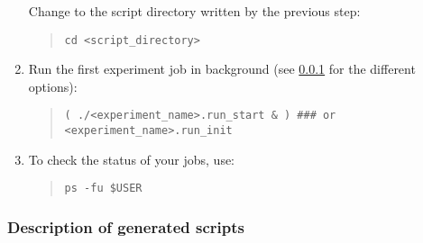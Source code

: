 \begin{enumerate}
Change to the script directory written by the previous step:
\begin{quote}
\begin{verbatim}
cd <script_directory>
\end{verbatim}
\end{quote}

\item

Run the first experiment job in background (see
\ref{runscripts:generation:generated_scripts} for the different options):
%
\begin{quote}
\begin{verbatim}
( ./<experiment_name>.run_start & ) ### or <experiment_name>.run_init
\end{verbatim}
\end{quote}

\item 

To check the status of your jobs, use:
%
\begin{quote}
\begin{verbatim}
ps -fu $USER
\end{verbatim}
\end{quote}

\end{enumerate}

\subsubsection{Description of generated scripts}
\label{runscripts:generation:generated_scripts}

